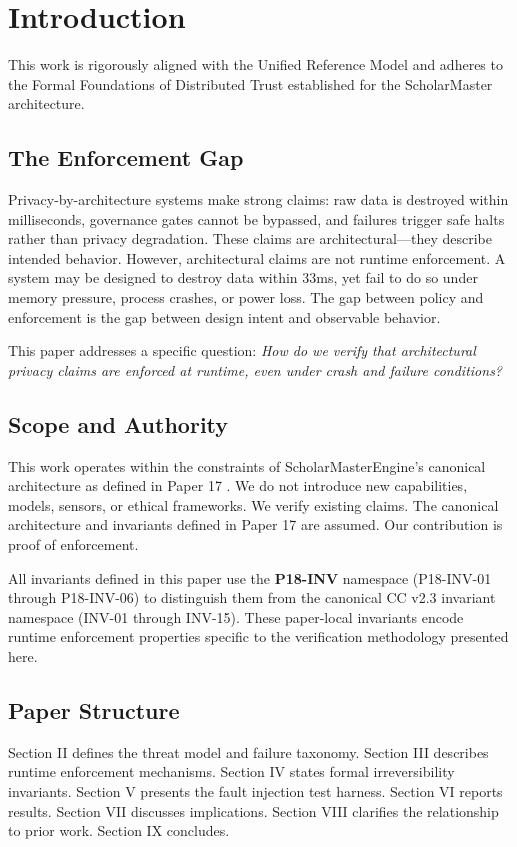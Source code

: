 \documentclass[conference]{IEEEtran}
\begin{document}
\section{Introduction} This work is rigorously aligned with the Unified Reference Model \cite{P20} and adheres to the Formal Foundations of Distributed Trust \cite{P21} established for the ScholarMaster architecture.

\subsection{The Enforcement Gap}
Privacy-by-architecture systems make strong claims: raw data is destroyed within milliseconds, governance gates cannot be bypassed, and failures trigger safe halts rather than privacy degradation. These claims are architectural---they describe intended behavior. However, architectural claims are not runtime enforcement. A system may be designed to destroy data within 33ms, yet fail to do so under memory pressure, process crashes, or power loss. The gap between policy and enforcement is the gap between design intent and observable behavior.

This paper addresses a specific question: \textit{How do we verify that architectural privacy claims are enforced at runtime, even under crash and failure conditions?}

\subsection{Scope and Authority}
This work operates within the constraints of ScholarMasterEngine's canonical architecture as defined in Paper 17 \cite{b17}. We do not introduce new capabilities, models, sensors, or ethical frameworks. We verify existing claims. The canonical architecture and invariants defined in Paper 17 are assumed. Our contribution is proof of enforcement.

All invariants defined in this paper use the \textbf{P18-INV} namespace (P18-INV-01 through P18-INV-06) to distinguish them from the canonical CC v2.3 invariant namespace (INV-01 through INV-15). These paper-local invariants encode runtime enforcement properties specific to the verification methodology presented here.

\subsection{Paper Structure}
Section II defines the threat model and failure taxonomy. Section III describes runtime enforcement mechanisms. Section IV states formal irreversibility invariants. Section V presents the fault injection test harness. Section VI reports results. Section VII discusses implications. Section VIII clarifies the relationship to prior work. Section IX concludes.
\end{document}
